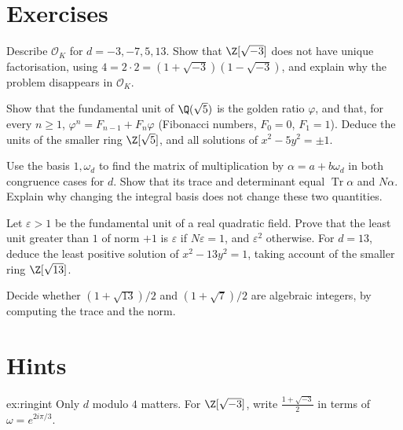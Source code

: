 \section{Exercises}

\begin{exercise}[$\star$]\label{ex:ringint}
Describe $\mathcal O_K$ for $d=-3,-7,5,13$. Show that $\Z[\sqrt{-3}]$ does not have unique factorisation, using $4=2\cdot2=(1+\sqrt{-3})(1-\sqrt{-3})$, and explain why the problem disappears in $\mathcal O_K$.
\end{exercise}

\begin{exercise}[$\star\star$]\label{ex:goldenunit}
Show that the fundamental unit of $\Q(\sqrt5)$ is the golden ratio $\varphi$, and that, for every $n\ge1$, $\varphi^n=F_{n-1}+F_n\varphi$ (Fibonacci numbers, $F_0=0$, $F_1=1$). Deduce the units of the smaller ring $\Z[\sqrt5]$, and all solutions of $x^2-5y^2=\pm1$.
\end{exercise}

\begin{exercise}[$\star\star$]\label{ex:t1-norm-matrix}
Use the basis $1,\omega_d$ to find the matrix of multiplication by
$\alpha=a+b\omega_d$ in both congruence cases for $d$.
Show that its trace and determinant equal $\operatorname{Tr}\alpha$
and $N\alpha$. Explain why changing the integral basis does not change
these two quantities.
\end{exercise}

\begin{exercise}[$\star\star$]\label{ex:t1-unit-sign}
Let $\varepsilon>1$ be the fundamental unit of a real quadratic field.
Prove that the least unit greater than $1$ of norm $+1$ is
$\varepsilon$ if $N\varepsilon=1$, and $\varepsilon^2$ otherwise.
For $d=13$, deduce the least positive solution of $x^2-13y^2=1$,
taking account of the smaller ring $\Z[\sqrt{13}]$.
\end{exercise}

\begin{exercise}[$\star$]\label{ex:t1-half}
Decide whether $(1+\sqrt{13})/2$ and $(1+\sqrt{7})/2$ are algebraic integers, by computing the trace and the norm.
\end{exercise}

\section{Hints}

\begin{hint}{ex:ringint}
Only $d$ modulo $4$ matters. For $\Z[\sqrt{-3}]$, write $\frac{1+\sqrt{-3}}2$ in terms of $\omega=e^{2i\pi/3}$.
\end{hint}

